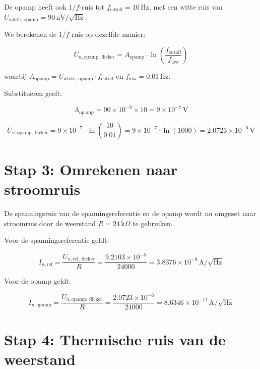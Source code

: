 \documentclass{article}
\begin{document}
	De opamp heeft ook \(1/f\)-ruis tot \( f_{\text{cutoff}} = 10 \, \text{Hz} \), met een witte ruis van \( U_{\text{white, opamp}} = 90 \, \text{nV}/\sqrt{\text{Hz}} \).
	
	We berekenen de \(1/f\)-ruis op dezelfde manier:
	
	\begin{equation}
		U_{n,\text{opamp, flicker}} = A_{\text{opamp}} \cdot \ln\left(\frac{f_{\text{cutoff}}}{f_{\text{low}}}\right)
	\end{equation}
	
	waarbij \( A_{\text{opamp}} = U_{\text{white, opamp}} \cdot f_{\text{cutoff}} \) en \( f_{\text{low}} = 0.01 \, \text{Hz} \).
	
	Substitueren geeft:
	
	\begin{equation}
		A_{\text{opamp}} = 90 \times 10^{-9} \times 10 = 9 \times 10^{-7} \, \text{V}
	\end{equation}
	
	\begin{equation}
		U_{n,\text{opamp, flicker}} = 9 \times 10^{-7} \cdot \ln\left(\frac{10}{0.01}\right) = 9 \times 10^{-7} \cdot \ln(1000) = 2.0723 \times 10^{-6} \, \text{V}
	\end{equation}
	
	\section{Stap 3: Omrekenen naar stroomruis}
	
	De spanningsruis van de spanningsreferentie en de opamp wordt nu omgezet naar stroomruis door de weerstand \( R = 24 \, \text{k}\Omega \) te gebruiken.
	
	Voor de spanningsreferentie geldt:
	
	\begin{equation}
		I_{n,\text{ref}} = \frac{U_{n,\text{ref, flicker}}}{R} = \frac{9.2103 \times 10^{-5}}{24000} = 3.8376 \times 10^{-9} \, \text{A}/\sqrt{\text{Hz}}
	\end{equation}
	
	Voor de opamp geldt:
	
	\begin{equation}
		I_{n,\text{opamp}} = \frac{U_{n,\text{opamp, flicker}}}{R} = \frac{2.0723 \times 10^{-6}}{24000} = 8.6346 \times 10^{-11} \, \text{A}/\sqrt{\text{Hz}}
	\end{equation}
	
	\section{Stap 4: Thermische ruis van de weerstand}
	
\end{document}
